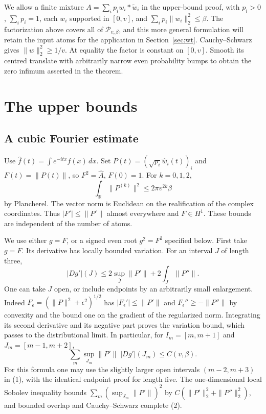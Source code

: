 \documentclass[11pt]{article}
\newcommand{\cP}{\mathcal P}
\begin{document}
We allow a finite mixture \(A=\sum_i p_i w_i*\widetilde w_i\) in the upper-bound proof, with \(p_i>0\), \(\sum_i p_i=1\), each \(w_i\) supported in \([0,v]\), and \(\sum_i p_i\|w_i\|_2^2\le\beta\). The factorization above covers all of \(\cP_{v,\beta}\), and this more general formulation will retain the input atoms for the application in Section~\ref{sec:wt}. Cauchy--Schwarz gives \(\|w\|_2^2\ge1/v\). At equality the factor is constant on \([0,v]\). Smooth its centred translate with arbitrarily narrow even probability bumps to obtain the zero infimum asserted in the theorem.

\section{The upper bounds}
\subsection{A cubic Fourier estimate}

Use \(\widehat f(t)=\int e^{-itx}f(x)\,dx\). Set \(P(t)=(\sqrt{p_i}\widehat w_i(t))_i\) and \(F(t)=\|P(t)\|\), so \(F^2=\widehat A\), \(F(0)=1\). For \(k=0,1,2\),
\[
 \int_{\mathbb R}\|P^{(k)}\|^2\le 2\pi v^{2k}\beta
\]
by Plancherel. The vector norm is Euclidean on the realification of the complex coordinates. Thus \(|F'|\le\|P'\|\) almost everywhere and \(F\in H^1\). These bounds are independent of the number of atoms.

We use either \(g=F\), or a signed even root \(g^2=F^2\) specified below. First take \(g=F\). Its derivative has locally bounded variation. For an interval \(J\) of length three,
\[
   |Dg'|(J)\le 2\sup_{\bar J}\|P'\|+2\int_J\|P''\| .               \tag{1}
\]
One can take \(J\) open, or include endpoints by an arbitrarily small enlargement. Indeed \(F_\epsilon=(\|P\|^2+\epsilon^2)^{1/2}\) has \(|F_\epsilon'|\le\|P'\|\) and \(F_\epsilon''\ge-\|P''\|\) by convexity and the bound one on the gradient of the regularized norm. Integrating its second derivative and its negative part proves the variation bound, which passes to the distributional limit. In particular, for \(I_m=[m,m+1]\) and \(J_m=[m-1,m+2]\),
\[
 \sum_m\sup_{J_m}\|P'\|\; |Dg'|(J_m)\le C(v,\beta).               \tag{2}
\]
For this formula one may use the slightly larger open intervals \((m-2,m+3)\) in (1), with the identical endpoint proof for length five. The one-dimensional local Sobolev inequality bounds \(\sum_m(\sup_{J_m}\|P'\|)^2\) by \(C(\|P'\|_2^2+\|P''\|_2^2)\), and bounded overlap and Cauchy--Schwarz complete (2).
\end{document}
